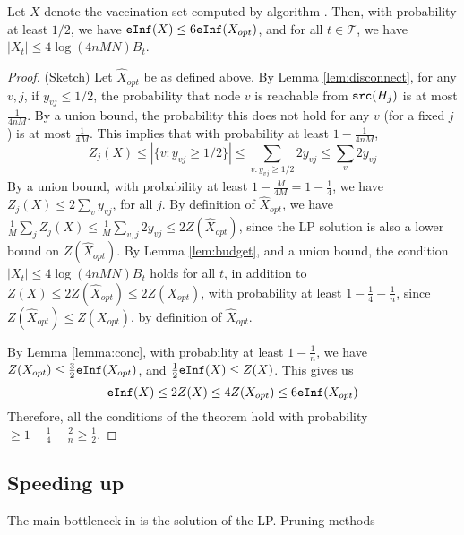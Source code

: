 \begin{theorem}
\label{theorem:algo}
Let $X$ denote the vaccination set computed by algorithm \algo{}.
Then, with probability at least $1/2$, we have
$\texttt{eInf}(X)\leq 6\texttt{eInf}(X_{opt})$, and for all $t\in\mathcal{T}$, we have
$|X_t|\leq 4\log(4nMN)B_t$.
\end{theorem}
\begin{proof} (Sketch)
Let $\hat{X}_{opt}$ be as defined above. 
By Lemma \ref{lem:disconnect}, for any $v, j$, if $y_{vj} \leq 1/2$, the probability that node $v$ is
reachable from $\texttt{src}(H_j)$ is at most $\frac{1}{4nM}$.
By a union bound, the probability this does not hold for any $v$ (for a fixed $j$) is at most $\frac{1}{4M}$.
This implies that with probability at least $1-\frac{1}{4nM}$, 
\[
Z_j(X)\leq |\{v: y_{vj}\geq 1/2\}|\leq \sum_{v: y_{vj}\geq 1/2} 2y_{vj} \leq \sum_v 2y_{vj}
\]
By a union bound, with probability at least $1-\frac{M}{4M}=1-\frac{1}{4}$,
we have $Z_j(X)\leq 2\sum_v y_{vj}$, for all $j$.
By definition of $\hat{X}_{opt}$, we have $\frac{1}{M}\sum_j Z_j(X)\leq \frac{1}{M}\sum_{v,j} 2y_{vj} \leq 2Z(\hat{X}_{opt})$,
since the LP solution is also a lower bound on $Z(\hat{X}_{opt})$.
By Lemma \ref{lem:budget}, and a union bound, the condition $|X_t|\leq 4\log(4nMN)B_t$ holds for all $t$,
in addition to $Z(X)\leq 2Z(\hat{X}_{opt})\leq 2Z(X_{opt})$, with probability at least $1-\frac{1}{4}-\frac{1}{n}$,
since $Z(\hat{X}_{opt})\leq Z(X_{opt})$, by definition of $\hat{X}_{opt}$.

By Lemma \ref{lemma:conc}, with probability at least $1-\frac{1}{n}$,
we have $Z(X_{opt})\leq \frac{3}{2}\texttt{eInf}(X_{opt})$, and
$\frac{1}{2}\texttt{eInf}(X)\leq Z(X)$. This gives us
\[
\texttt{eInf}(X)\leq 2Z(X)\leq 4Z(X_{opt})\leq 6\texttt{eInf}(X_{opt})
\]
Therefore, all the conditions of the theorem hold with probability $\geq 1-\frac{1}{4}-\frac{2}{n}\geq \frac{1}{2}$.
\end{proof}


\subsection{Speeding up \algo{}}

The main bottleneck in \algo{} is the solution of the LP. Pruning methods
